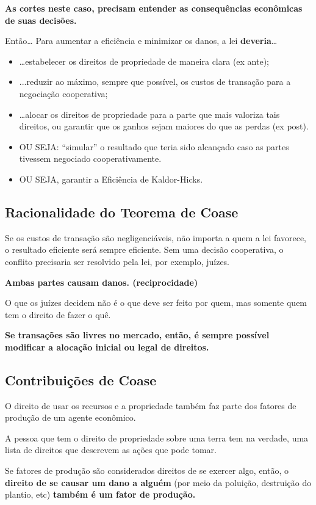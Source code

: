 \documentclass[a4paper,12pt]{article}[abntex2]
\begin{document}
\textbf{As cortes neste caso, precisam entender as consequências econômicas de suas decisões.}

Então… Para aumentar a eficiência e minimizar os danos, a lei \textbf{deveria}… \begin{itemize}
    \item …estabelecer os direitos de propriedade de maneira clara (ex ante);
    \item ...reduzir ao máximo, sempre que possível, os custos de transação para a negociação cooperativa;
    \item …alocar os direitos de propriedade para a parte que mais valoriza tais direitos, ou garantir que os ganhos sejam maiores do que as perdas (ex post).
    \item OU SEJA: “simular” o resultado que teria sido alcançado caso as partes tivessem negociado cooperativamente.  
    \item OU SEJA, garantir a Eficiência de Kaldor-Hicks.
\end{itemize}

\subsection{\textbf{Racionalidade do Teorema de Coase}}
Se os custos de transação são negligenciáveis, não importa a quem a lei favorece, o resultado eficiente será sempre eficiente.
Sem uma decisão cooperativa, o conflito precisaria ser resolvido pela lei, por exemplo, juízes.

\textbf{Ambas partes causam danos. (reciprocidade)}

O que os juízes decidem não é o que deve ser feito por quem, mas somente quem tem o direito de fazer o quê.

\textbf{Se transações são livres no mercado, então, é sempre possível modificar a alocação inicial ou legal de direitos.}

\subsection{\textbf{Contribuições de Coase}}
O direito de usar os recursos e a propriedade também faz parte dos fatores de produção de um agente econômico.

A pessoa que tem o direito de propriedade sobre uma terra tem na verdade, uma lista de direitos que descrevem as ações que pode tomar.

Se fatores de produção são considerados direitos de se exercer algo, então, o \textbf{direito de se causar um dano a alguém} (por meio da poluição, destruição do plantio, etc) \textbf{também é um fator de produção.}
\newpage
\end{document}
